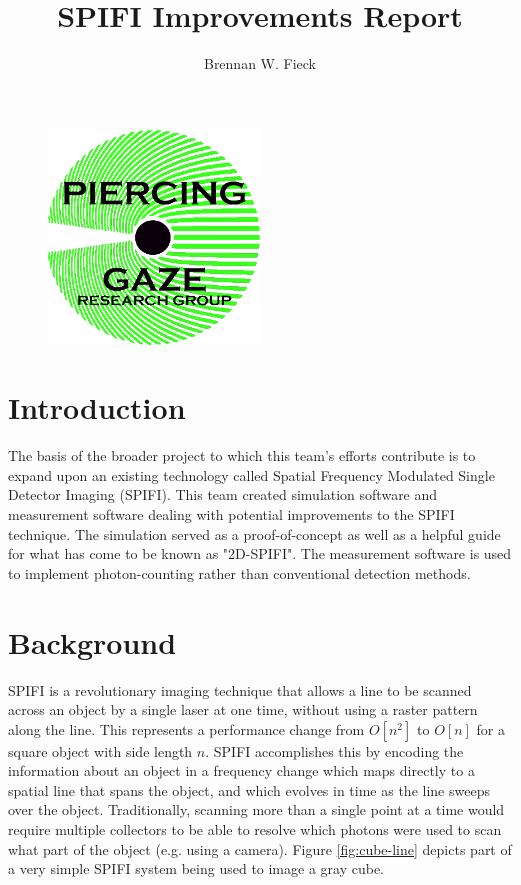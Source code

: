 \documentclass[12pt]{article}
\title{SPIFI Improvements Report}
\author{Brennan W. Fieck}
\begin{document}
\begin{titlepage}
\clearpage\maketitle
\thispagestyle{empty}
\begin{figure}[H]
\centering
\includegraphics[width=0.5\textwidth]{team-logo.png}
\end{figure}
\end{titlepage}

\section*{Introduction}
The basis of the broader project to which this team's efforts contribute
is to expand upon an existing technology called  Spatial Frequency
Modulated Single Detector Imaging (SPIFI). This team created simulation
software and measurement software dealing with potential improvements to
the SPIFI technique. The simulation served as a proof-of-concept as well
as a helpful guide for what has come to be known as "2D-SPIFI". The measurement software is used to implement photon-counting rather than conventional detection methods.

\section*{Background}
SPIFI is a revolutionary imaging technique that allows a line to be scanned
across an object by a single laser at one time, without using a raster pattern
along the line. This represents a performance change from $O[n^2]$ to $O[n]$ for a square object with side length $n$. SPIFI accomplishes this by encoding the information about an object in a
frequency change which maps directly to a spatial line that spans the object,
and which evolves in time as the line sweeps over the object. Traditionally, scanning more than a single point at a time
would require multiple collectors to be able to
resolve which photons were used to scan what part of the object (e.g.
using a camera). Figure \ref{fig:cube-line} depicts part of a very simple SPIFI system being used to image a gray cube.
\end{document}
